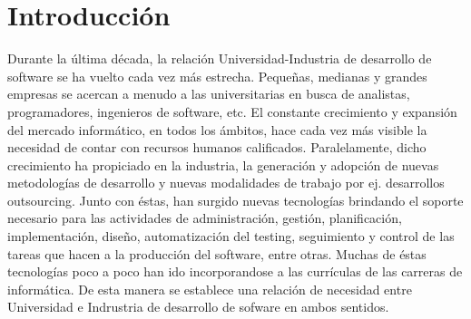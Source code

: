 \section{Introducción}

Durante la última década, la relación Universidad-Industria de desarrollo de software se ha vuelto cada vez más estrecha. Pequeñas, medianas y grandes empresas 
se acercan a menudo a las universitarias en busca de analistas, programadores, ingenieros de software, etc.
El constante crecimiento y expansión 
del mercado informático, en todos los ámbitos, hace cada vez más visible la necesidad de contar con 
recursos humanos calificados. Paralelamente, dicho crecimiento ha propiciado en la industria, la generación y 
adopción de nuevas 
metodologías de desarrollo y nuevas modalidades de trabajo por ej. desarrollos outsourcing.
Junto con éstas, han surgido nuevas tecnologías brindando el soporte necesario para las actividades de administración, 
gestión, planificación, implementación, diseño, automatización del testing, seguimiento y control de las tareas que hacen a la producción 
del software, entre otras. 
 Muchas de éstas tecnologías poco a poco han ido  incorporandose a las currículas de las carreras de informática. De esta manera se establece 
 una relación de necesidad entre Universidad e Indrustria de desarrollo de sofware en ambos sentidos.
 
